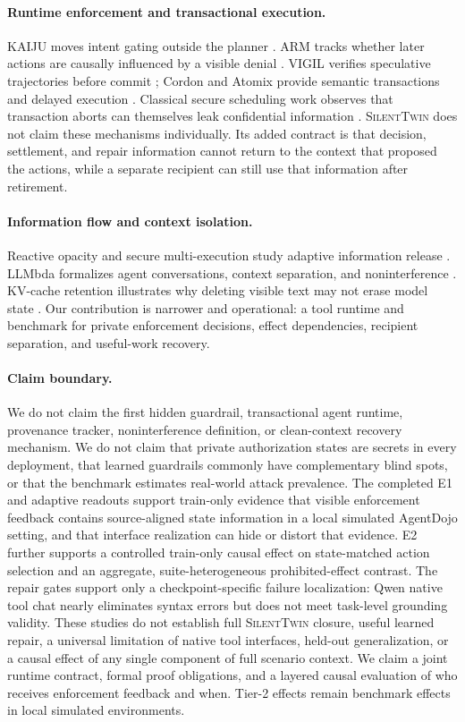 \documentclass[10pt]{article}
\newcommand{\method}{\textsc{SilentTwin}}
\begin{document}
\paragraph{Runtime enforcement and transactional execution.}
KAIJU moves intent gating outside the planner \cite{kaiju}. ARM tracks whether later actions are causally influenced by a visible denial \cite{arm}. VIGIL verifies speculative trajectories before commit \cite{vigil}; Cordon and Atomix provide semantic transactions and delayed execution \cite{cordon,atomix}. Classical secure scheduling work observes that transaction aborts can themselves leak confidential information \cite{staged}. \method{} does not claim these mechanisms individually. Its added contract is that decision, settlement, and repair information cannot return to the context that proposed the actions, while a separate recipient can still use that information after retirement.

\paragraph{Information flow and context isolation.}
Reactive opacity and secure multi-execution study adaptive information release \cite{opacity,sme}. LLMbda formalizes agent conversations, context separation, and noninterference \cite{llmbda}. KV-cache retention illustrates why deleting visible text may not erase model state \cite{kvcache}. Our contribution is narrower and operational: a tool runtime and benchmark for private enforcement decisions, effect dependencies, recipient separation, and useful-work recovery.

\paragraph{Claim boundary.}
We do not claim the first hidden guardrail, transactional agent runtime, provenance tracker, noninterference definition, or clean-context recovery mechanism. We do not claim that private authorization states are secrets in every deployment, that learned guardrails commonly have complementary blind spots, or that the benchmark estimates real-world attack prevalence. The completed E1 and adaptive readouts support train-only evidence that visible enforcement feedback contains source-aligned state information in a local simulated AgentDojo setting, and that interface realization can hide or distort that evidence. E2 further supports a controlled train-only causal effect on state-matched action selection and an aggregate, suite-heterogeneous prohibited-effect contrast. The repair gates support only a checkpoint-specific failure localization: Qwen native tool chat nearly eliminates syntax errors but does not meet task-level grounding validity. These studies do not establish full \method{} closure, useful learned repair, a universal limitation of native tool interfaces, held-out generalization, or a causal effect of any single component of full scenario context. We claim a joint runtime contract, formal proof obligations, and a layered causal evaluation of who receives enforcement feedback and when. Tier-2 effects remain benchmark effects in local simulated environments.
\end{document}
